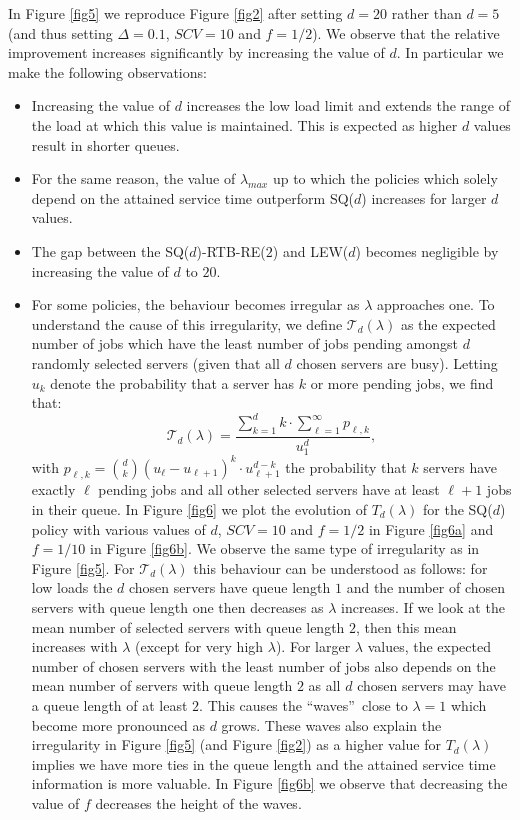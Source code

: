 \documentclass[12pt]{report}
\begin{document}
In Figure \ref{fig5} we reproduce Figure \ref{fig2} after setting $d=20$ rather than $d=5$ (and thus setting $\Delta=0.1$, $SCV=10$ and $f=1/2$). We observe that the relative improvement increases significantly by increasing the value of $d$. In particular we make the following observations:
\begin{itemize}
\item Increasing the value of $d$ increases the low load limit and extends the range of
the load at which this value is maintained. This is expected as higher $d$ values
result in shorter queues.
\item For the same reason, the value of $\lambda_{max}$ 
up to which the policies which solely depend on the 
attained service time outperform SQ($d$) increases for larger $d$ values.
\item The gap between the SQ($d$)-RTB-RE($2$) and LEW($d$) becomes negligible by increasing the value of $d$ to $20$.
\item For some policies, the behaviour becomes irregular as $\lambda$ approaches one. To understand the cause of this irregularity, we define $\mathcal{T}_d(\lambda)$ as the expected number of jobs which have the least number of jobs pending amongst $d$ randomly selected servers (given that all $d$ chosen servers are busy). Letting $u_k$ denote the probability that a server has $k$ or more pending jobs, we find that:
\begin{equation} \label{eq:Tdlam}
\mathcal{T}_d(\lambda)=\frac{\sum_{k=1}^d k \cdot \sum_{\ell=1}^\infty p_{\ell,k} }{u_1^d},
\end{equation}
with $p_{\ell,k}=\binom{d}{k} (u_\ell - u_{\ell+1})^k \cdot u_{\ell+1}^{d-k}$ the probability that $k$ servers have exactly $\ell$ pending jobs and all other selected servers have at least $\ell+1$ jobs in their queue. In Figure \ref{fig6} we plot the evolution of $T_d(\lambda)$ for the SQ($d$) policy with various values of $d$, $SCV=10$ and $f=1/2$ in Figure \ref{fig6a} and $f=1/10$ in Figure \ref{fig6b}. We observe the same type of irregularity as in Figure \ref{fig5}. For $\mathcal{T}_d(\lambda)$ this behaviour can be understood as follows:
for low loads the $d$ chosen servers have queue length $1$ and the number of chosen servers with queue length one then decreases as $\lambda$ increases. 
If we look at the mean number of selected servers with queue length $2$,
then this mean increases with $\lambda$ (except for very high $\lambda$). For larger 
$\lambda$ values, the expected number of chosen servers with the least number of jobs 
also depends on the mean number of servers with queue length $2$ as all $d$ 
chosen servers
may have a queue length of at least $2$. This causes the \textquotedblleft waves\textquotedblright\ close to $\lambda=1$ which become more pronounced as $d$ grows. These waves also explain the irregularity in Figure \ref{fig5} (and Figure \ref{fig2}) as a higher value for $T_d(\lambda)$ implies we have more ties in the queue length and the attained service time information
is more valuable. In Figure \ref{fig6b} we observe that decreasing the value of $f$ decreases the 
height of the waves.
\end{itemize}
\end{document}
